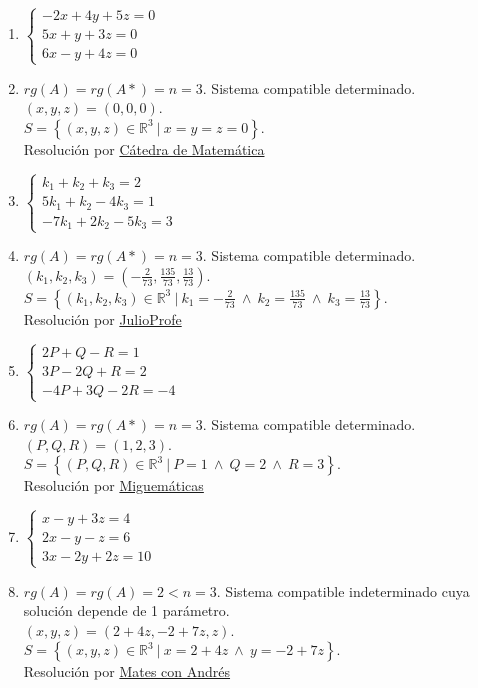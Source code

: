 \documentclass[a4paper]{article}
\newcommand{\answer}{\item[**]}
\begin{document}
\begin{enumerate}
\begin{multicols}{2}
\begin{enumerate} [label=(\alph*)]
		\item $\left\{\begin{matrix} -2x+4y+5z=0 \\ 5x+y+3z=0 \\ 6x-y+4z=0 \end{matrix}\right.$
		\answer $rg(A)=rg(A*)=n=3$. Sistema compatible determinado. \\ $(x,y,z)=(0,0,0)$. \\ $S=\left\{(x,y,z)\in \mathbb{R}^3 ~|~ x=y=z=0 \right\}$. \\ Resolución por \href{https://youtu.be/5tOyCI7YIwk?t=21}{Cátedra de Matemática}

		\item $\left\{\begin{matrix} k_1+k_2+k_3=2 \\ 5k_1+k_2-4k_3=1 \\ -7k_1+2k_2-5k_3=3 \end{matrix}\right.$
		\answer $rg(A)=rg(A*)=n=3$. Sistema compatible determinado. \\ $(k_1,k_2,k_3)=\left(-\frac{2}{73},\frac{135}{73},\frac{13}{73}\right)$. \\ $S=\left\{(k_1,k_2,k_3)\in \mathbb{R}^3 ~|~ k_1=-\frac{2}{73} ~\land~ k_2=\frac{135}{73} ~\land~ k_3=\frac{13}{73} \right\}$. \\ Resolución por \href{https://youtu.be/SxT5Sbn8odE}{JulioProfe}

		\item $\left\{\begin{matrix} 2P+Q-R=1 \\ 3P-2Q+R=2 \\ -4P+3Q-2R=-4 \end{matrix}\right.$
		\answer  $rg(A)=rg(A*)=n=3$. Sistema compatible determinado. \\ $(P,Q,R)=(1,2,3)$. \\ $S=\left\{(P,Q,R)\in \mathbb{R}^3 ~|~ P=1 ~\land~ Q=2 ~\land~ R=3 \right\}$. \\ Resolución por \href{https://youtu.be/kpRQ_jWHSqg?t=95}{Miguemáticas}

		\item $\left\{\begin{matrix} x-y+3z=4 \\ 2x-y-z=6 \\ 3x-2y+2z=10 \end{matrix}\right.$
		\answer  $rg(A)=rg(A)=2<n=3$. Sistema compatible indeterminado cuya solución depende de 1 parámetro. \\ $(x,y,z)=(2+4z,-2+7z,z)$. \\ $S=\left\{(x,y,z)\in \mathbb{R}^3 ~|~ x=2+4z ~\land~ y=-2+7z \right\}$. \\ Resolución por \href{https://youtu.be/ERUAPI-jrH0}{Mates con Andrés}



\end{enumerate}
\end{multicols}
\end{enumerate}
\end{document}
